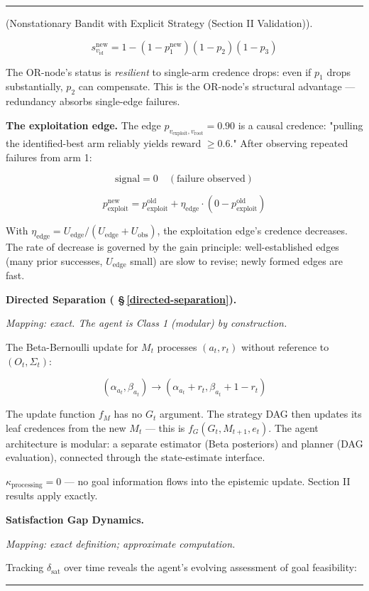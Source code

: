 \documentclass[11pt,oneside]{article}
\newcounter{claim}[section]
\renewcommand{\theclaim}{\thesection.\arabic{claim}}
\newenvironment{segment}[2]{%
  \refstepcounter{claim}%
  \bigskip\noindent\hrule\smallskip
  \noindent{\bfseries #1~\theclaim}\enskip(#2).\par\smallskip
  \noindent\ignorespaces
}{%
  \par\smallskip\noindent\hrule\bigskip
}
\newenvironment{remark}[1][]{\begin{segment}{Remark}{#1}}{\end{segment}}
\begin{document}
\begin{remark}[Nonstationary Bandit with Explicit Strategy (Section II Validation)]
$$s_{v_\text{id}}^{\text{new}} = 1 - (1 - p_1^{\text{new}})(1 - p_2)(1 - p_3)$$

The OR-node's status is \textit{resilient} to single-arm credence drops: even if $p_1$ drops substantially, $p_2$ can compensate. This is the OR-node's structural advantage — redundancy absorbs single-edge failures.

\textbf{The exploitation edge.} The edge $p_{v_\text{exploit}, v_\text{root}} = 0.90$ is a causal credence: "pulling the identified-best arm reliably yields reward $\geq 0.6$." After observing repeated failures from arm 1:

$$\text{signal} = 0 \quad (\text{failure observed})$$

$$p_\text{exploit}^{\text{new}} = p_\text{exploit}^{\text{old}} + \eta_\text{edge} \cdot (0 - p_\text{exploit}^{\text{old}})$$

With $\eta_\text{edge} = U_\text{edge}/(U_\text{edge} + U_\text{obs})$, the exploitation edge's credence decreases. The rate of decrease is governed by the gain principle: well-established edges (many prior successes, $U_\text{edge}$ small) are slow to revise; newly formed edges are fast.


\medskip\noindent\textbf{Directed Separation ( \S\,\ref{directed-separation}).}


\textit{Mapping: exact. The agent is Class 1 (modular) by construction.}

The Beta-Bernoulli update for $M_t$ processes $(a_t, r_t)$ without reference to $(O_t, \Sigma_t)$:

$$(\alpha_{a_t}, \beta_{a_t}) \to (\alpha_{a_t} + r_t, \beta_{a_t} + 1 - r_t)$$

The update function $f_M$ has no $G_t$ argument. The strategy DAG then updates its leaf credences from the new $M_t$ — this is $f_G(G_t, M_{t+1}, e_t)$. The agent architecture is modular: a separate estimator (Beta posteriors) and planner (DAG evaluation), connected through the state-estimate interface.

$\kappa_\text{processing} = 0$ — no goal information flows into the epistemic update. Section II results apply exactly.


\medskip\noindent\textbf{Satisfaction Gap Dynamics.}


\textit{Mapping: exact definition; approximate computation.}

Tracking $\delta_\text{sat}$ over time reveals the agent's evolving assessment of goal feasibility:


\end{remark}
\end{document}
